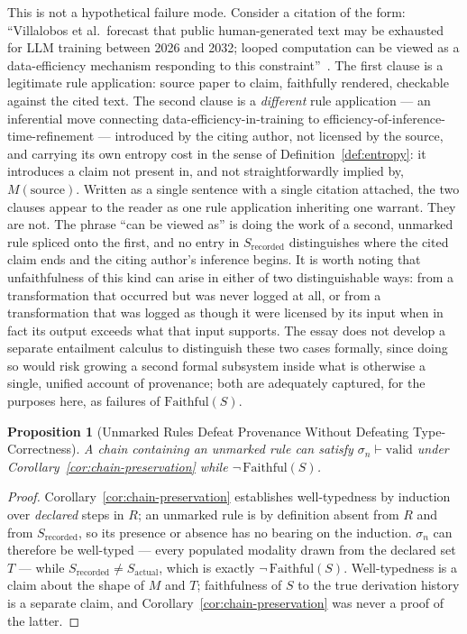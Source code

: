 \documentclass[11pt]{article}
\newtheorem{proposition}[theorem]{Proposition}
\theoremstyle{definition}
\begin{document}
This is not a hypothetical failure mode. Consider a citation of the form: ``Villalobos et al.\ forecast that public human-generated text may be exhausted for LLM training between 2026 and 2032; looped computation can be viewed as a data-efficiency mechanism responding to this constraint''~\cite{villalobos2024}. The first clause is a legitimate rule application: source paper to claim, faithfully rendered, checkable against the cited text. The second clause is a \emph{different} rule application --- an inferential move connecting data-efficiency-in-training to efficiency-of-inference-time-refinement --- introduced by the citing author, not licensed by the source, and carrying its own entropy cost in the sense of Definition~\ref{def:entropy}: it introduces a claim not present in, and not straightforwardly implied by, $M(\text{source})$. Written as a single sentence with a single citation attached, the two clauses appear to the reader as one rule application inheriting one warrant. They are not. The phrase ``can be viewed as'' is doing the work of a second, unmarked rule spliced onto the first, and no entry in $S_{\mathrm{recorded}}$ distinguishes where the cited claim ends and the citing author's inference begins. It is worth noting that unfaithfulness of this kind can arise in either of two distinguishable ways: from a transformation that occurred but was never logged at all, or from a transformation that was logged as though it were licensed by its input when in fact its output exceeds what that input supports. The essay does not develop a separate entailment calculus to distinguish these two cases formally, since doing so would risk growing a second formal subsystem inside what is otherwise a single, unified account of provenance; both are adequately captured, for the purposes here, as failures of $\mathrm{Faithful}(S)$.

\begin{proposition}[Unmarked Rules Defeat Provenance Without Defeating Type-Correctness]
\label{prop:unmarked}
A chain containing an unmarked rule can satisfy $\sigma_n \vdash \mathrm{valid}$ under Corollary~\ref{cor:chain-preservation} while $\neg\, \mathrm{Faithful}(S)$.
\end{proposition}

\begin{proof}
Corollary~\ref{cor:chain-preservation} establishes well-typedness by induction over \emph{declared} steps in $R$; an unmarked rule is by definition absent from $R$ and from $S_{\mathrm{recorded}}$, so its presence or absence has no bearing on the induction. $\sigma_n$ can therefore be well-typed --- every populated modality drawn from the declared set $T$ --- while $S_{\mathrm{recorded}} \neq S_{\mathrm{actual}}$, which is exactly $\neg\,\mathrm{Faithful}(S)$. Well-typedness is a claim about the shape of $M$ and $T$; faithfulness of $S$ to the true derivation history is a separate claim, and Corollary~\ref{cor:chain-preservation} was never a proof of the latter.
\end{proof}
\end{document}
